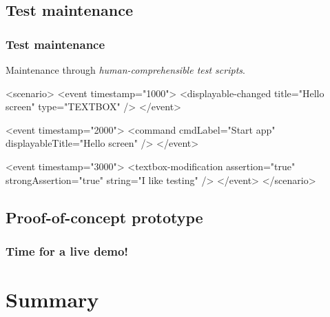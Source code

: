 \documentclass[compress]{beamer}
\begin{document}
\begin{frame}
\end{frame}

\begin{frame}
\end{frame}



\subsection[Maintenance]{Test maintenance}

\begin{frame}[containsverbatim]
    \frametitle{Test maintenance}

    Maintenance through \emph{human-comprehensible test scripts}.

    \bigskip
\begin{xmlblock}
<scenario>
  <event timestamp="1000">
      <displayable-changed title="Hello screen" type="TEXTBOX" />
  </event>
    
  <event timestamp="2000">
      <command cmdLabel="Start app" displayableTitle="Hello screen" />
  </event>
    
  <event timestamp="3000">        
      <textbox-modification assertion="true" strongAssertion="true" 
                            string="I like testing" />
  </event>
</scenario>
\end{xmlblock}

\end{frame}


\subsection[Prototype]{Proof-of-concept prototype} %

\begin{frame}[plain]
	\frametitle{Time for a live demo!}


\end{frame}

\section*{Summary} %
\end{document}
